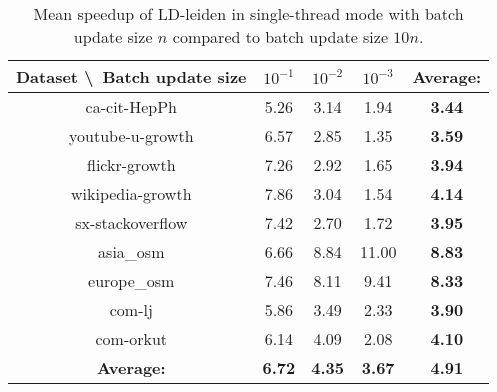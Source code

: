 \begin{table}[H]
	\centering
	\begin{tabular}{|c|c|c|c|c|}
		\hline
		Dataset \textbackslash\ Batch update size& $10^{-1}$ & $10^{-2}$ & $10^{-3}$ & \textbf{Average:} \\
		\hline
		ca-cit-HepPh & 5.26 & 3.14 & 1.94 & \textbf{3.44} \\
		\hline
		youtube-u-growth & 6.57 & 2.85 & 1.35 & \textbf{3.59} \\
		\hline
		flickr-growth & 7.26 & 2.92 & 1.65 & \textbf{3.94} \\
		\hline
		wikipedia-growth & 7.86 & 3.04 & 1.54 & \textbf{4.14} \\
		\hline
		sx-stackoverflow & 7.42 & 2.70 & 1.72 & \textbf{3.95} \\
		\hline
		asia\_osm & 6.66 & 8.84 & 11.00 & \textbf{8.83} \\
		\hline
		europe\_osm & 7.46 & 8.11 & 9.41 & \textbf{8.33} \\
		\hline
		com-lj & 5.86 & 3.49 & 2.33 & \textbf{3.90} \\
		\hline
		com-orkut & 6.14 & 4.09 & 2.08 & \textbf{4.10} \\
		\hline
		\textbf{Average:} & \textbf{6.72} & \textbf{4.35} & \textbf{3.67} & \textbf{4.91} \\
		\hline
	\end{tabular}
\caption{Mean speedup of LD-leiden in single-thread mode with batch update size $n$ compared to batch update size $10 n$.}
\label{T:time speedup for LD-leiden}
\end{table}